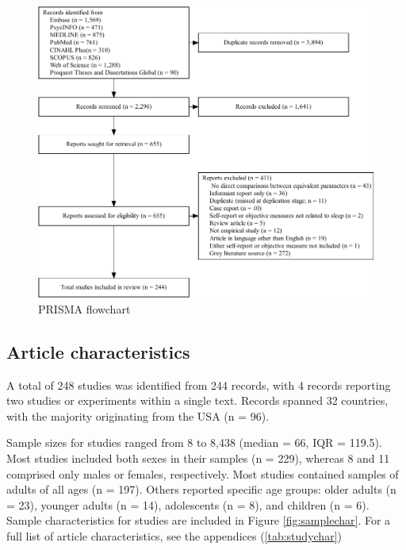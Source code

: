 \documentclass[
]{article}
\begin{document}
\begin{figure}
\centering
\includegraphics{review_markdown_files/figure-latex/PRISMA-1.pdf}
\caption{\label{fig:PRISMA}PRISMA flowchart}
\end{figure}

\subsection{Article characteristics}\label{article-characteristics}

A total of 248 studies was identified from 244 records, with 4 records reporting two studies or experiments within a single text. Records spanned 32 countries, with the majority originating from the USA (n = 96).

Sample sizes for studies ranged from 8 to 8,438 (median = 66, IQR = 119.5). Most studies included both sexes in their samples (n = 229), whereas 8 and 11 comprised only males or females, respectively. Most studies contained samples of adults of all ages (n = 197). Others reported specific age groups: older adults (n = 23), younger adults (n = 14), adolescents (n = 8), and children (n = 6). Sample characteristics for studies are included in Figure \ref{fig:samplechar}. For a full list of article characteristics, see the appendices (\ref{tab:studychar})
\end{document}

